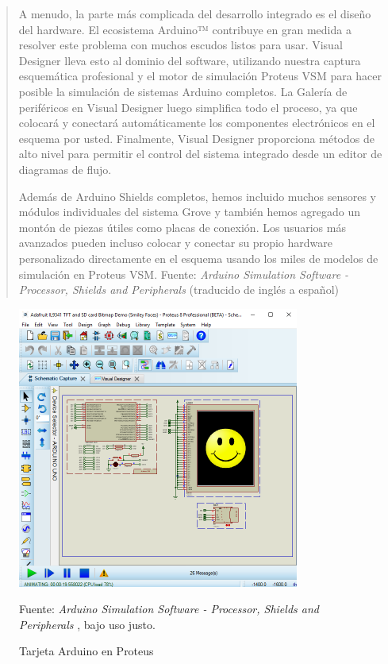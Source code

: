 \documentclass{article}
\begin{document}
\begin{quote}
    A menudo, la parte más complicada del desarrollo integrado es el diseño del hardware. El ecosistema Arduino™ contribuye en gran medida a resolver este problema con muchos escudos listos para usar. Visual Designer lleva esto al dominio del software, utilizando nuestra captura esquemática profesional y el motor de simulación Proteus VSM para hacer posible la simulación de sistemas Arduino completos. La Galería de periféricos en Visual Designer luego simplifica todo el proceso, ya que colocará y conectará automáticamente los componentes electrónicos en el esquema por usted. Finalmente, Visual Designer proporciona métodos de alto nivel para permitir el control del sistema integrado desde un editor de diagramas de flujo.

    \bigbreak

    Además de Arduino Shields completos, hemos incluido muchos sensores y módulos individuales del sistema Grove y también hemos agregado un montón de piezas útiles como placas de conexión. Los usuarios más avanzados pueden incluso colocar y conectar su propio hardware personalizado directamente en el esquema usando los miles de modelos de simulación en Proteus VSM.\bigbreak \footnotesize
    Fuente: \textit{Arduino Simulation Software - Processor, Shields and Peripherals} (traducido de inglés a español) \cite{labcenter-electronics-2022}
\end{quote}

\begin{figure}[H]
    \centering
    \includegraphics[width=0.3\paperwidth]{images/schematic.png}
    \caption{Tarjeta Arduino en Proteus}\footnotesize
    Fuente: \textit{Arduino Simulation Software - Processor, Shields and Peripherals} \cite{labcenter-electronics-2022}, bajo uso justo.
\end{figure}
\end{document}
